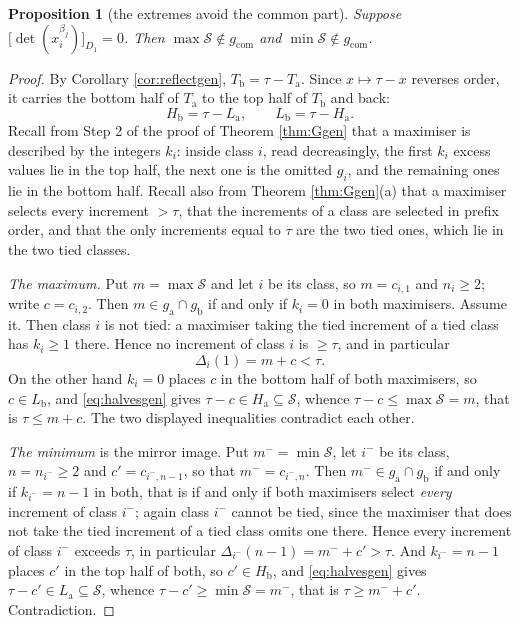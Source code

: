 \documentclass[11pt,reqno]{amsart}
\theoremstyle{plain}
\newtheorem{proposition}[theorem]{Proposition}
\theoremstyle{definition}
\begin{document}
\begin{proposition}[the extremes avoid the common part]\label{prop:A1gen}
Suppose $\bigl[\det(x_i^{\beta_j})\bigr]_{D_1}=0$. Then
$\max\mathcal{S}\notin g_{\mathrm{com}}$ and $\min\mathcal{S}\notin g_{\mathrm{com}}$.
\end{proposition}

\begin{proof}
By Corollary \ref{cor:reflectgen}, $T_{\mathrm b}=\tau-T_{\mathrm a}$. Since $x\mapsto\tau-x$ reverses
order, it carries the bottom half of $T_{\mathrm a}$ to the top half of $T_{\mathrm b}$ and back:
\begin{equation}\label{eq:halvesgen}
  H_{\mathrm b}=\tau-L_{\mathrm a},\qquad L_{\mathrm b}=\tau-H_{\mathrm a}.
\end{equation}
Recall from Step 2 of the proof of Theorem \ref{thm:Ggen} that a maximiser is described by the
integers $k_i$: inside class $i$, read decreasingly, the first $k_i$ excess values lie in the top half,
the next one is the omitted $g_i$, and the remaining ones lie in the bottom half. Recall also from
Theorem \ref{thm:Ggen}(a) that a maximiser selects every increment $>\tau$, that the increments of a
class are selected in prefix order, and that the only increments equal to $\tau$ are the two tied ones,
which lie in the two tied classes.

\emph{The maximum.} Put $m=\max\mathcal{S}$ and let $i$ be its class, so $m=c_{i,1}$ and $n_i\ge2$;
write $c=c_{i,2}$. Then $m\in g_{\mathrm a}\cap g_{\mathrm b}$ if and only if $k_i=0$ in both
maximisers. Assume it. Then class $i$ is not tied: a maximiser taking the tied increment of a tied
class has $k_i\ge1$ there. Hence no increment of class $i$ is $\ge\tau$, and in particular
\[
  \Delta_i(1)=m+c<\tau .
\]
On the other hand $k_i=0$ places $c$ in the bottom half of both maximisers, so $c\in L_{\mathrm b}$,
and \eqref{eq:halvesgen} gives $\tau-c\in H_{\mathrm a}\subseteq\mathcal{S}$, whence
$\tau-c\le\max\mathcal{S}=m$, that is $\tau\le m+c$. The two displayed inequalities contradict each
other.

\emph{The minimum} is the mirror image. Put $m^{-}=\min\mathcal{S}$, let $i^{-}$ be its class,
$n=n_{i^{-}}\ge2$ and $c'=c_{i^{-},n-1}$, so that $m^{-}=c_{i^{-},n}$. Then
$m^{-}\in g_{\mathrm a}\cap g_{\mathrm b}$ if and only if $k_{i^{-}}=n-1$ in both, that is if and only
if both maximisers select \emph{every} increment of class $i^{-}$; again class $i^{-}$ cannot be tied,
since the maximiser that does not take the tied increment of a tied class omits one there. Hence every
increment of class $i^{-}$ exceeds $\tau$, in particular $\Delta_{i^{-}}(n-1)=m^{-}+c'>\tau$. And
$k_{i^{-}}=n-1$ places $c'$ in the top half of both, so $c'\in H_{\mathrm b}$, and
\eqref{eq:halvesgen} gives $\tau-c'\in L_{\mathrm a}\subseteq\mathcal{S}$, whence
$\tau-c'\ge\min\mathcal{S}=m^{-}$, that is $\tau\ge m^{-}+c'$. Contradiction.
\end{proof}
\end{document}
